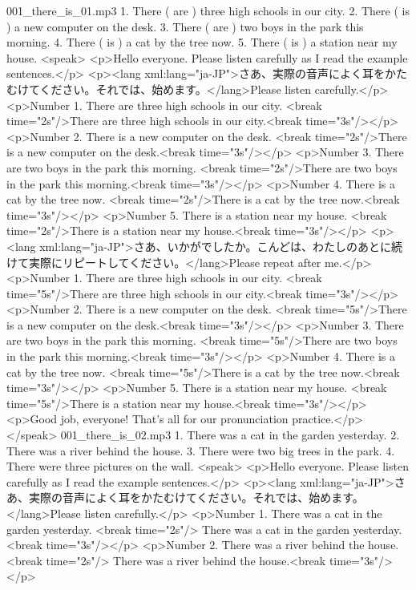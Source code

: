 001_there_is_01.mp3
1. There ( are ) three high schools in our city.
2. There ( is ) a new computer on the desk.
3. There ( are ) two boys in the park this morning.
4. There ( is ) a cat by the tree now.
5. There ( is ) a station near my house.
<speak>
<p>Hello everyone. Please listen carefully as I read the example sentences.</p>
<p><lang xml:lang="ja-JP">さあ、実際の音声によく耳をかたむけてください。それでは、始めます。</lang>Please listen carefully.</p>
<p>Number 1. There are three high schools in our city. <break time="2s"/>There are three high schools in our city.<break time="3s"/></p>
<p>Number 2. There is a new computer on the desk. <break time="2s"/>There is a new computer on the desk.<break time="3s"/></p>
<p>Number 3. There are two boys in the park this morning. <break time="2s"/>There are two boys in the park this morning.<break time="3s"/></p>
<p>Number 4. There is a cat by the tree now. <break time="2s"/>There is a cat by the tree now.<break time="3s"/></p>
<p>Number 5. There is a station near my house. <break time="2s"/>There is a station near my house.<break time="3s"/></p>
<p><lang xml:lang="ja-JP">さあ、いかがでしたか。こんどは、わたしのあとに続けて実際にリピートしてください。</lang>Please repeat after me.</p>
<p>Number 1.  There are three high schools in our city. <break time="5s"/>There are three high schools in our city.<break time="3s"/></p>
<p>Number 2.  There is a new computer on the desk. <break time="5s"/>There is a new computer on the desk.<break time="3s"/></p>
<p>Number 3.  There are two boys in the park this morning. <break time="5s"/>There are two boys in the park this morning.<break time="3s"/></p>
<p>Number 4.  There is a cat by the tree now. <break time="5s"/>There is a cat by the tree now.<break time="3s"/></p>
<p>Number 5.  There is a station near my house. <break time="5s"/>There is a station near my house.<break time="3s"/></p>
<p>Good job, everyone! That's all for our pronunciation practice.</p>
</speak>
001_there_is_02.mp3
1. There was a cat in the garden yesterday.
2. There was a river behind the house.
3. There were two big trees in the park.
4. There were three pictures on the wall.
<speak>
<p>Hello everyone. Please listen carefully as I read the example sentences.</p>
<p><lang xml:lang="ja-JP">さあ、実際の音声によく耳をかたむけてください。それでは、始めます。</lang>Please listen carefully.</p>
<p>Number 1.  There was a cat in the garden yesterday. <break time="2s"/> There was a cat in the garden yesterday.<break time="3s"/></p>
<p>Number 2.  There was a river behind the house. <break time="2s"/> There was a river behind the house.<break time="3s"/></p>
